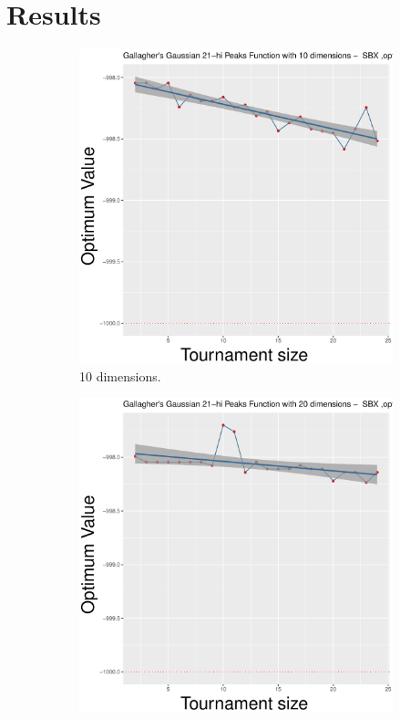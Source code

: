 \section{Results}\label{sec:results}

\begin{figure}[t]
	\begin{subfigure}[b]{0.33\textwidth}
		\centering
		\includegraphics[width=\textwidth]{img/SBX-10D/multimodal_sbx_22_dim_10.pdf}
		\caption{10 dimensions.}
	\end{subfigure}
	\begin{subfigure}[b]{0.33\textwidth}
		\centering
		\includegraphics[width=\textwidth]{img/SBX-20D/multimodal_sbx_22_dim_20.pdf}

\end{subfigure}
\end{figure}
